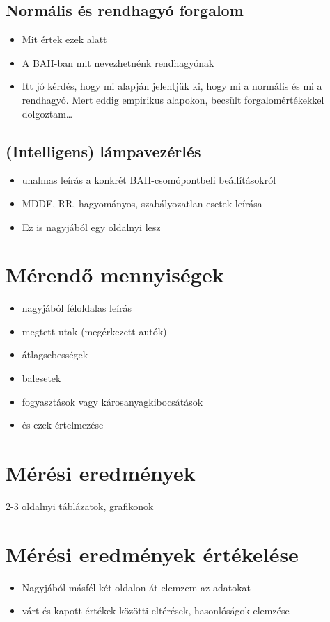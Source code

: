 \documentclass{report}
\begin{document}
			\subsection{Normális és rendhagyó forgalom}
				\begin{itemize}
					\item Mit értek ezek alatt
					\item A BAH-ban mit nevezhetnénk rendhagyónak
					\item Itt jó kérdés, hogy mi alapján jelentjük ki, hogy mi a normális és mi a rendhagyó. Mert eddig empirikus alapokon, becsült forgalomértékekkel dolgoztam\dots
				\end{itemize}
			\subsection{(Intelligens) lámpavezérlés}
				\begin{itemize}
					\item unalmas leírás a konkrét BAH-csomópontbeli beállításokról
					\item MDDF, RR, hagyományos, szabályozatlan esetek leírása
					\item Ez is nagyjából egy oldalnyi lesz
				\end{itemize}
		\section{Mérendő mennyiségek}
			\begin{itemize}
				\item nagyjából féloldalas leírás
				\item megtett utak (megérkezett autók)
				\item átlagsebességek
				\item balesetek
				\item fogyasztások vagy károsanyagkibocsátások
				\item és ezek értelmezése
			\end{itemize}
		\section{Mérési eredmények}
			2-3 oldalnyi táblázatok, grafikonok
		\section{Mérési eredmények értékelése}
			\begin{itemize}
				\item Nagyjából másfél-két oldalon át elemzem az adatokat
				\item várt és kapott értékek közötti eltérések, hasonlóságok elemzése
			\end{itemize}
\end{document}

